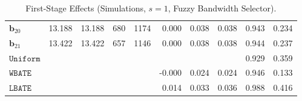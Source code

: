 \documentclass[10pt]{article}
\newcommand{\bb}{\mathbf{b}}
\begin{document}
\begin{table}[p]
\begin{tabular}{lccccrrrrr}
$\bb_{20}$ & 13.188 & 13.188 & 680 & 1174 & 0.000 & 0.038 & 0.038 & 0.943 & 0.234 \\
$\bb_{21}$ & 13.422 & 13.422 & 657 & 1146 & 0.000 & 0.038 & 0.038 & 0.944 & 0.237 \\
\midrule
$\mathtt{Uniform}$ &  &  &  &  &  &  &  & 0.929 & 0.359 \\
\midrule
$\mathtt{WBATE}$ &  &  &  &  & -0.000 & 0.024 & 0.024 & 0.946 & 0.133 \\
\midrule
$\mathtt{LBATE}$ &  &  &  &  & 0.014 & 0.033 & 0.036 & 0.988 & 0.416 \\
\bottomrule\bottomrule
\end{tabular}

    \caption{First-Stage Effects (Simulations, $s=1$, Fuzzy Bandwidth Selector).}
    \label{tab:sa-simuls-fs-s1-bwmain}
\end{table}
\end{document}
